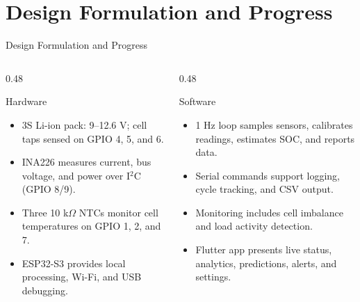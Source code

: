 \documentclass[10pt,aspectratio=43]{beamer}
\begin{document}
\section{Design Formulation and Progress}
\begin{frame}{Design Formulation and Progress}
  \begin{columns}[T,onlytextwidth]
    \begin{column}{0.48\textwidth}
      \begin{block}{Hardware}
        \footnotesize
        \begin{itemize}
          \setlength{\itemsep}{3pt}
          \item 3S Li-ion pack: 9--12.6 V; cell taps sensed on GPIO 4, 5, and 6.
          \item INA226 measures current, bus voltage, and power over I$^2$C (GPIO 8/9).
          \item Three 10 k$\Omega$ NTCs monitor cell temperatures on GPIO 1, 2, and 7.
          \item ESP32-S3 provides local processing, Wi-Fi, and USB debugging.
        \end{itemize}
      \end{block}
    \end{column}
    \hfill
    \begin{column}{0.48\textwidth}
      \begin{block}{Software}
        \footnotesize
        \begin{itemize}
          \setlength{\itemsep}{3pt}
          \item 1 Hz loop samples sensors, calibrates readings, estimates SOC, and reports data.
          \item Serial commands support logging, cycle tracking, and CSV output.
          \item Monitoring includes cell imbalance and load activity detection.
          \item Flutter app presents live status, analytics, predictions, alerts, and settings.
        \end{itemize}
      \end{block}
    \end{column}
  \end{columns}
\end{frame}
\end{document}
